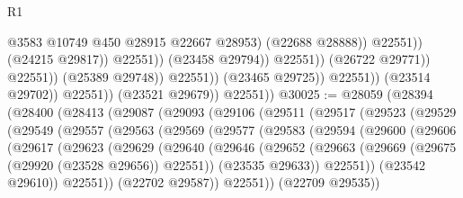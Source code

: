 \begin{lexlean}{R1}
\begin{coremodule}
                                                      @3583
                                                      @10749
                                                      @450
                                                      @28915
                                                      @22667
                                                      @28953)
                                                    (@22688 @28888))
                                                  @22551))
                                              (@24215 @29817))
                                            @22551))
                                        (@23458 @29794))
                                      @22551))
                                  (@26722 @29771))
                                @22551))
                            (@25389 @29748))
                          @22551))
                      (@23465 @29725))
                    @22551))
                (@23514 @29702))
              @22551))
          (@23521 @29679))
        @22551))
@30025 := @28059
    (@28394
      (@28400
        (@28413
          (@29087
            (@29093
              (@29106
                (@29511
                  (@29517
                    (@29523
                      (@29529
                        (@29549
                          (@29557
                            (@29563
                              (@29569
                                (@29577
                                  (@29583
                                    (@29594
                                      (@29600
                                        (@29606
                                          (@29617
                                            (@29623
                                              (@29629
                                                (@29640
                                                  (@29646
                                                    (@29652
                                                      (@29663
                                                        (@29669
                                                          (@29675 (@29920 (@23528 @29656)) @22551))
                                                        (@23535 @29633))
                                                      @22551))
                                                  (@23542 @29610))
                                                @22551))
                                            (@22702 @29587))
                                          @22551))
                                      (@22709 @29535))

\end{coremodule}
\end{lexlean}
